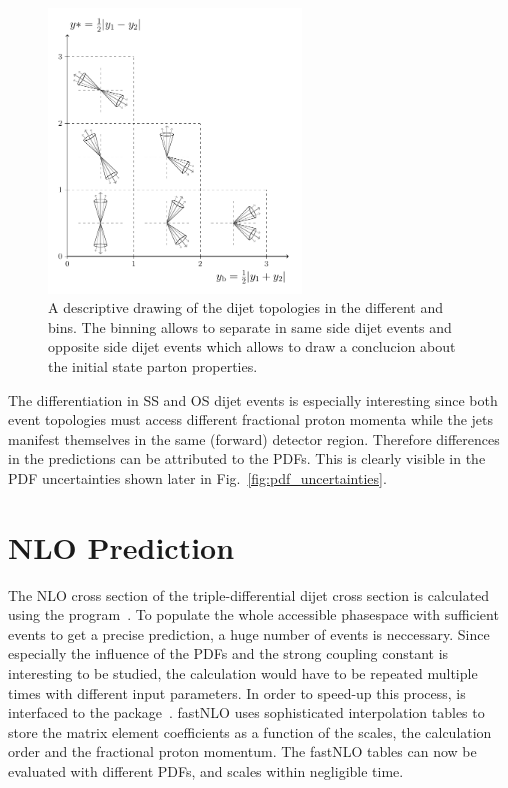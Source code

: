 \begin{figure}[htbp]
    \centering
    \includegraphics[width=0.6\textwidth]{figures/measurement/ybys.pdf}
    \caption{A descriptive drawing of the dijet topologies in the different
    \ystar and \yboost bins. The binning allows to separate in same side dijet
    events and opposite side dijet events which allows to draw a conclucion about
    the initial state parton properties.}
    \label{fig:ysyb_schema}
\end{figure}

The differentiation in SS and OS dijet events is especially interesting since
both event topologies must access different fractional proton momenta while the
jets manifest themselves in the same (forward) detector region. Therefore
differences in the predictions can be attributed to the PDFs. This is clearly
visible in the PDF uncertainties shown later in
Fig.~\ref{fig:pdf_uncertainties}.

\section{NLO Prediction}

The NLO cross section of the triple-differential dijet cross section is
calculated using the \NLOJETPP program~\cite{Nagy:2003tz}. To populate the whole
accessible phasespace with sufficient events to get a precise prediction, a huge
number of events is neccessary. Since especially the influence of the PDFs and
the strong coupling constant is interesting to be studied, the calculation would
have to be repeated multiple times with different input parameters. In order to
speed-up this process, \NLOJETPP is interfaced to the \fastNLO
package~\cite{Kluge:2006xs,Britzger:2012bs}. fastNLO uses sophisticated interpolation tables to store
the matrix element coefficients as a function of the scales, the calculation
order and the fractional proton momentum. The fastNLO tables can now be evaluated with
different PDFs, \as and scales within negligible time. 

